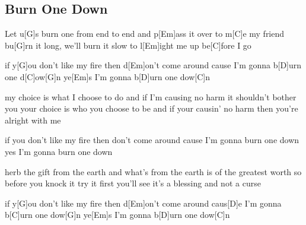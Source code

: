 \subsection*{Burn One Down   }
\begin{guitar}
Let u[G]s burn one from end to end
and p[Em]ass it over to m[C]e my friend
bu[G]rn it long, we'll burn it slow
to l[Em]ight me up be[C]fore I go 



if y[G]ou don't like my fire
then d[Em]on't come around
cause I'm gonna b[D]urn one d[C]ow[G]n
ye[Em]s I'm gonna b[D]urn one dow[C]n



my choice is what I choose to do
and if I'm causing no harm it shouldn't bother you
your choice is who you choose to be
and if your causin' no harm then you're alright with me 



if you don't like my fire
then don't come around
cause I'm gonna burn one down
yes I'm gonna burn one down



herb the gift from the earth
and what's from the earth is of the greatest worth
so before you knock it try it first
you'll see it's a blessing and not a curse 



if y[G]ou don't like my fire
then d[Em]on't come around
caus[D]e I'm gonna b[C]urn one dow[G]n
ye[Em]s I'm gonna b[D]urn one dow[C]n
\end{guitar}
